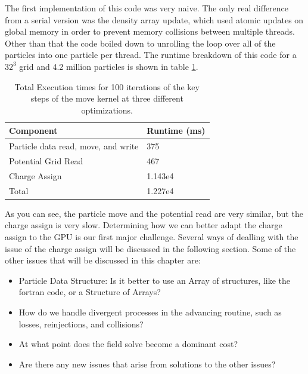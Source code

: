 The first implementation of this code was very naive. The only real difference from a serial version was the density array update, which used atomic updates on global memory in order to prevent memory collisions between multiple threads. Other than that the code boiled down to unrolling the loop over all of the particles into one particle per thread. The runtime breakdown of this code for a $32^3$ grid and 4.2 million particles is shown in table \ref{tab:GPUPIC_basetime}.

\begin{center}
\begin{table}
\begin{tabular}{| p{4.0cm} | p{3.5cm} |}
\hline
Component & Runtime (ms) \\ \hline
Particle data read, move, and write & 375 \\ \hline
Potential Grid Read & 467 \\ \hline
Charge Assign & 1.143e4  \\ \hline
Total & 1.227e4  \\ \hline
\end{tabular}
\caption{Total Execution times for 100 iterations of the key steps of the move kernel at three different optimizations.}
\label{tab:GPUPIC_basetime} 
\end{table}
\end{center}

As you can see, the particle move and the potential read are very similar, but the charge assign is very slow. Determining how we can better adapt the charge assign to the GPU is our first major challenge. Several ways of dealling with the issue of the charge assign will be discussed in the following section. Some of the other issues that will be discussed in this chapter are:

\begin{itemize}\itemsep0pt \parskip0pt 
\item Particle Data Structure: Is it better to use an Array of structures, like the fortran code, or a Structure of Arrays?
\item How do we handle divergent processes in the advancing routine, such as losses, reinjections, and collisions?
\item At what point does the field solve become a dominant cost?
\item Are there any new issues that arise from solutions to the other issues?
\end{itemize}

